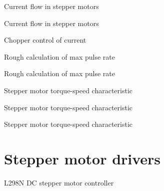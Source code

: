\documentclass[compress]{beamer}
\begin{document}
{
    \begin{frame}{Current flow in stepper motors}
    \end{frame}
}

{
    \begin{frame}{Current flow in stepper motors}
    \end{frame}
}

{
    \begin{frame}{Chopper control of current}
    \end{frame}
}

{
    \begin{frame}{Rough calculation of max pulse rate}
    \end{frame}
}

{
    \begin{frame}{Rough calculation of max pulse rate}
    \end{frame}
}

{
    \begin{frame}{Stepper motor torque-speed characteristic}
    \end{frame}
}

{
    \begin{frame}{Stepper motor torque-speed characteristic}
    \end{frame}
}

{
    \begin{frame}{Stepper motor torque-speed characteristic}
    \end{frame}
}

\section[Drivers]{Stepper motor drivers}

{
    \begin{frame}{L298N DC stepper motor controller}
    \end{frame}
}
\end{document}
